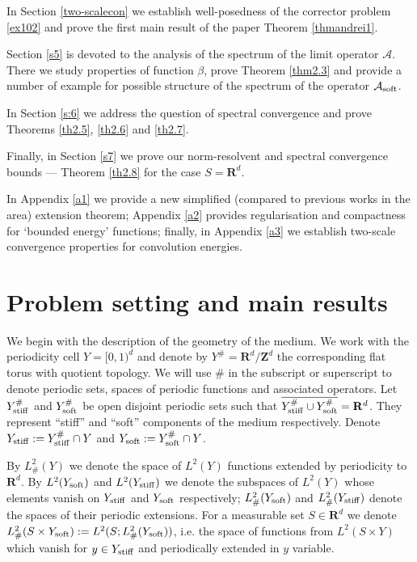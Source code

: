 \documentclass[11pt]{article}
\newcommand\stiff{{\rm stiff}}
\newcommand\soft{{\rm soft}}
\newcommand{\R}{\mathbf{R}}
\def\AA{\mathcal{A}}
\newcommand\Z{\mathbf{Z}}
\theoremstyle{remark}
\begin{document}
In Section \ref{two-scalecon} we establish well-posedness of the corrector problem \eqref{ex102} and  prove the first main result of the paper Theorem \ref{thmandrei1}.

Section \ref{s5} is devoted to the analysis of the spectrum of the limit operator $\AA$. There we study properties of function $\beta$, prove Theorem \ref{thm2.3} and provide a number of example for possible structure of the spectrum of the operator $\AA_\soft$.

In Section \ref{s:6} we address the question of spectral convergence and prove Theorems \ref{th2.5}, \ref{th2.6} and \ref{th2.7}.

Finally, in Section \ref{s7} we prove our norm-resolvent and spectral convergence bounds --- Theorem \ref{th2.8} for the case $S=\R^d$.

In Appendix \ref{a1} we provide a new simplified (compared to previous works in the area) extension  theorem; Appendix \ref{a2} provides regularisation and compactness for `bounded energy' functions; finally, in Appendix \ref{a3} we establish two-scale convergence properties for convolution energies.




\bigskip




\section{Problem setting and main results} \label{secpbmsetting}




We begin with the description of the geometry of the medium. We work with the periodicity cell $Y=[0,1)^d$ and denote by $Y^{\#}=\R^d/\Z^d$  the corresponding flat torus with quotient topology. We will use $\#$ in the subscript or superscript to denote periodic sets, spaces of periodic functions and  associated operators. Let $Y_\stiff^{\#}$ and $Y_\soft^{\#}$   be open disjoint periodic sets such that $\overline{Y_\stiff^{\#} \cup Y_\soft^{\#}} = \R^d$. They represent ``stiff'' and ``soft'' components of the medium respectively. Denote $Y_\stiff:= Y_\stiff^{\#}\cap Y$ and $Y_\soft:= Y_\soft^{\#}\cap Y$.



By $L^2_\#(Y)$ we denote the space of $L^2(Y)$ functions extended by periodicity to  $\R^d$.  By $L^2(Y_\soft)$ and $L^2(Y_\stiff)$ we denote the subspaces of $L^2(Y)$ whose elements vanish on $Y_\stiff$ and $Y_\soft$ respectively;  $L^2_\#(Y_\soft)$ and $L^2_\#(Y_\stiff)$ denote the spaces of their periodic extensions. For a measurable set $S\in \R^d$ we denote $L^2_\#(S\times Y_\soft) : = L^2(S;L^2_\#(Y_\soft))$, i.e. the space of functions from $L^2(S\times Y)$ which vanish for $y\in Y_\stiff$ and periodically extended in $y$ variable.
\end{document}

